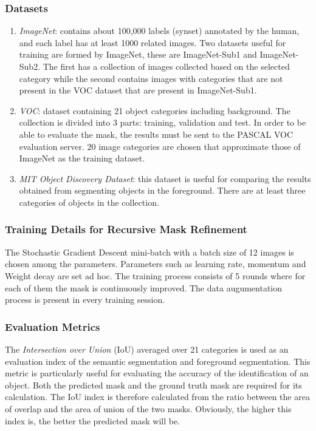 \subsubsection{Datasets}
\begin{enumerate}
    \item \emph{ImageNet}: contains about 100,000 labels (synset) annotated by the 
    human, and each label has at least 1000 related images. Two datasets 
    useful for training are formed by ImageNet, these are ImageNet-Sub1 
    and ImageNet-Sub2. The first has a collection of images collected based 
    on the selected category while the second contains images with categories 
    that are not present in the VOC dataset that are present in 
    ImageNet-Sub1.
    \item \emph{VOC}: dataset containing 21 object categories including background. 
    The collection is divided into 3 parts: training, validation and test. In 
    order to be able to evaluate the mask, the results must be sent to the 
    PASCAL VOC evaluation server. 20 image categories are chosen that 
    approximate those of ImageNet as the training dataset.
    \item \emph{MIT Object Discovery Dataset}: this dataset is useful for comparing the 
    results obtained from segmenting objects in the foreground. There are 
    at least three categories of objects in the collection.
\end{enumerate}

\subsubsection{Training Details for Recursive Mask Refinement}
The Stochastic Gradient Descent mini-batch with a batch size of 12 images 
is chosen among the parameters. Parameters such as learning rate, momentum 
and Weight decay are set ad hoc. The training process consists of 5 
rounds where for each of them the mask is continuously improved. The data 
augumentation process is present in every training session.

\subsubsection{Evaluation Metrics}
The \emph{Intersection over Union} (IoU) averaged over 21 categories is used as an 
evaluation index of the semantic segmentation and foreground segmentation. 
This metric is particularly useful for evaluating the accuracy of the identification 
of an object. Both the predicted mask and the ground truth mask 
are required for its calculation. The IoU index is therefore calculated from 
the ratio between the area of overlap and the area of union of the two masks. 
Obviously, the higher this index is, the better the predicted mask will be.

